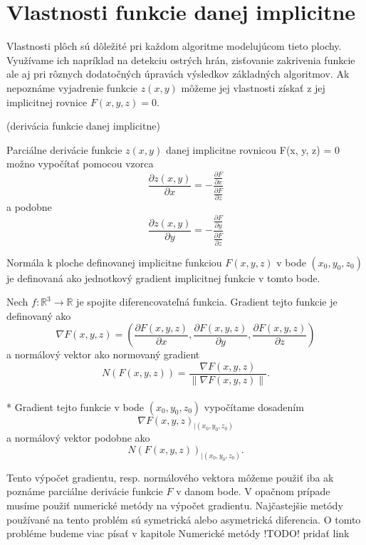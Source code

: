 \newpage

\section{Vlastnosti funkcie danej implicitne}

Vlastnosti plôch sú dôležité pri každom algoritme modelujúcom tieto plochy. Využívame ich napríklad na detekciu ostrých hrán, 
zisťovanie zakrivenia funkcie ale aj pri rôznych dodatočných úpravách výsledkov základných algoritmov.
Ak nepoznáme vyjadrenie funkcie $z(x, y)$ môžeme jej vlastnosti získať z jej implicitnej rovnice $F(x, y, z) = 0$.


\begin{theorem}
    (derivácia funkcie danej implicitne)

    Parciálne derivácie funkcie $z(x, y)$ danej implicitne rovnicou F(x, y, z) = 0 možno vypočítať pomocou vzorca
    $$\frac{\partial z(x, y)}{\partial x} = -\frac{\frac{\partial F}{\partial x}}{\frac{\partial F}{\partial z}}$$
    a podobne 
    $$\frac{\partial z(x, y)}{\partial y} = -\frac{\frac{\partial F}{\partial y}}{\frac{\partial F}{\partial z}}$$
\end{theorem}

Normála k ploche definovanej implicitne funkciou $F(x,y,z)$ v bode $(x_0, y_0, z_0)$ je definovaná ako jednotkový 
gradient implicitnej funkcie  v tomto bode.

\begin{definition}
    Nech $f : \mathbb{R}^3 \to \mathbb{R}$ je spojite diferencovateľná funkcia. Gradient tejto 
    funkcie je definovaný ako 
    $$\nabla F(x, y, z) = (\frac{\partial F(x, y, z)}{\partial x}, \frac{\partial F(x, y, z)}{\partial y}, 
    \frac{\partial F(x, y, z)}{\partial z})$$
    a normálový vektor ako normovaný gradient
    $$N(F(x, y, z))  = \frac{\nabla F(x, y, z)}{\| \nabla F(x, y, z) \|}.$$
    \\*
    Gradient tejto funkcie v bode $(x_0, y_0, z_0)$ vypočítame dosadením $$\nabla F(x, y, z)_{\big|(x_0, y_0, z_0)}$$ 
    a normálový vektor podobne ako $$N(F(x, y, z))_{\big|(x_0, y_0, z_0)}.$$
\end{definition}

Tento výpočet gradientu, resp. normálového vektora môžeme použiť iba ak poznáme parciálne derivácie funkcie $F$ v danom bode.
V opačnom prípade musíme použiť numerické metódy na výpočet gradientu. Najčastejšie metódy používané na tento problém sú 
symetrická alebo asymetrická diferencia. O tomto probléme budeme viac písať v kapitole Numerické metódy !TODO! pridať link 

